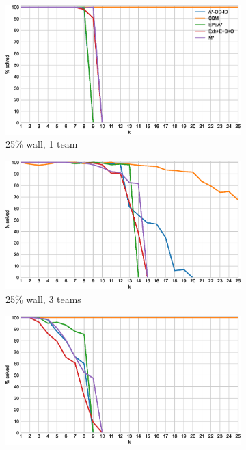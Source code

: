 \documentclass[english]{article}
\newcommand\graphwidth{0.49\textwidth}
\begin{document}
	\begin{figure}[b]
		\centering
		\begin{subfigure}{\graphwidth}
			\centering
			\includegraphics[width=\linewidth]{img/results/relative-comparison/25-1-p}
			\caption{25\% wall, 1 team}
			\label{fig:r-25-1-p}
		\end{subfigure}
		\begin{subfigure}{\graphwidth}
			\centering
			\includegraphics[width=\linewidth]{img/results/relative-comparison/25-3-p}
			\caption{25\% wall, 3 teams}
			\label{fig:r-25-3-p}
		\end{subfigure}
		\begin{subfigure}{\graphwidth}
			\centering
			\includegraphics[width=\linewidth]{img/results/relative-comparison/75-1-p}

\end{subfigure}
\end{figure}
\end{document}
